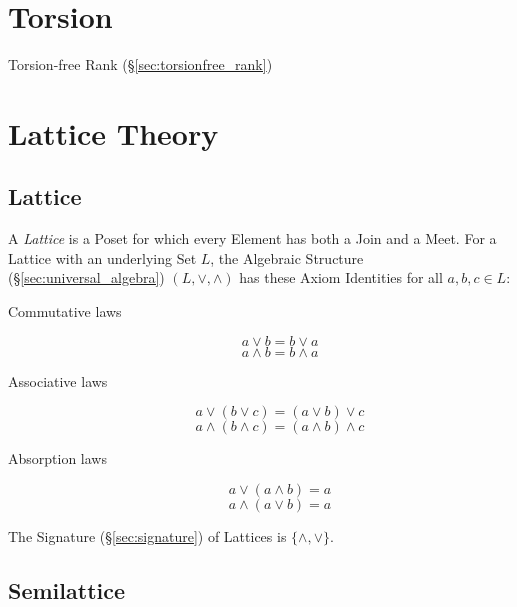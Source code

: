 \section{Torsion}\label{sec:torsion}

Torsion-free Rank (\S\ref{sec:torsionfree_rank})



\section{Lattice Theory}\label{sec:lattice_theory}

\subsection{Lattice}\label{sec:lattice}

A \emph{Lattice} is a Poset for which every Element has both a Join
and a Meet. For a Lattice with an underlying Set $L$, the Algebraic
Structure (\S\ref{sec:universal_algebra}) $(L, \vee, \wedge)$ has
these Axiom Identities for all $a,b,c \in L$:
\begin{description}
\item[Commutative laws]
\[
    a \vee b = b \vee a
\] \[
    a \wedge b = b \wedge a
\]
\item[Associative laws]
\[
    a \vee (b \vee c) = (a \vee b) \vee c
\] \[
    a \wedge (b \wedge c) = (a \wedge b) \wedge c
\]
\item[Absorption laws]
\[
    a \vee (a \wedge b) = a
\] \[
    a \wedge (a \vee b) = a
\]
\end{description}
The Signature (\S\ref{sec:signature}) of Lattices is
$\{\wedge, \vee\}$.



\subsection{Semilattice}\label{sec:semilattice}

